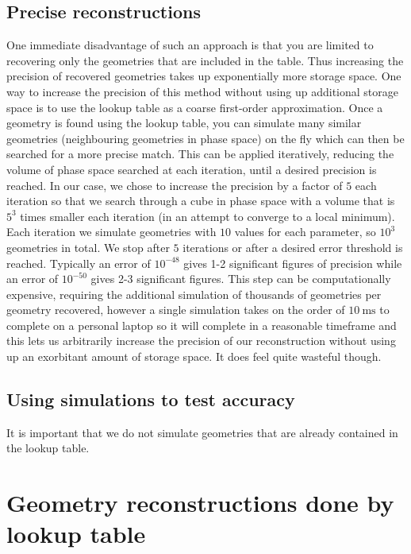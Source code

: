 \subsection{Precise reconstructions}

One immediate disadvantage of such an approach is that you are limited to recovering only the geometries that are included in the table. Thus increasing the precision of recovered geometries takes up exponentially more storage space. One way to increase the precision of this method without using up additional storage space is to use the lookup table as a coarse first-order approximation. Once a geometry is found using the lookup table, you can simulate many similar geometries (neighbouring geometries in phase space) on the fly which can then be searched for a more precise match. This can be applied iteratively, reducing the volume of phase space searched at each iteration, until a desired precision is reached. In our case, we chose to increase the precision by a factor of $5$ each iteration so that we search through a cube in phase space with a volume that is $5^3$ times smaller each iteration (in an attempt to converge to a local minimum). Each iteration we simulate geometries with $10$ values for each parameter, so $10^3$ geometries in total. We stop after $5$ iterations or after a desired error threshold is reached. Typically an error of $10^{-48}$ gives 1-2 significant figures of precision while an error of $10^{-50}$ gives 2-3 significant figures. This step can be computationally expensive, requiring the additional simulation of thousands of geometries per geometry recovered, however a single simulation takes on the order of $\SI{10}{\ms}$ to complete on a personal laptop so it will complete in a reasonable timeframe and this lets us arbitrarily increase the precision of our reconstruction without using up an exorbitant amount of storage space. It does feel quite wasteful though.

\subsection{Using simulations to test accuracy}
It is important that we do not simulate geometries that are already contained in the lookup table.

\section{Geometry reconstructions done by lookup table} \label{ssec:degenerateGeometries}


